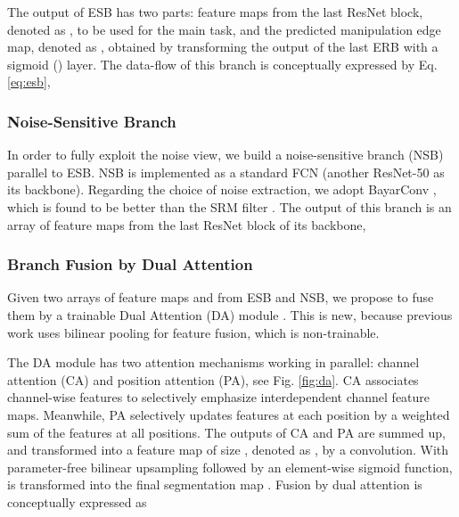 The output of ESB has two parts: feature maps from the last ResNet block, denoted as , to be used for the main task, and the predicted manipulation edge map, denoted as , obtained by transforming the output of the last ERB with a sigmoid () layer. The data-flow of this branch is conceptually expressed by Eq. \ref{eq:esb},






\subsubsection{Noise-Sensitive Branch }\label{sssec:nsb}



In order to fully exploit the noise view, we build a noise-sensitive branch (NSB) parallel to ESB. NSB is implemented as a standard FCN (another ResNet-50 as its backbone). Regarding the choice of noise extraction, we adopt BayarConv \cite{Bayar-journal}, which is found to be better than the SRM filter \cite{2020Constrained}. The output of this branch is an array of  feature maps from the last ResNet block of its backbone, \ie








\subsubsection{Branch Fusion by Dual Attention}\label{sssec:fusion}


Given two arrays of feature maps  and  from ESB and NSB, we propose to fuse them by a trainable Dual Attention (DA) module \cite{danet}. This is new, because previous work \cite{2018rgbn} uses bilinear pooling for feature fusion, which is non-trainable.

The DA module has two attention mechanisms working in parallel: channel attention (CA) and position attention (PA), see Fig. \ref{fig:da}. CA  associates channel-wise  features to selectively emphasize interdependent channel feature maps. Meanwhile, PA selectively updates features at each position by a weighted sum of the features at all positions. The outputs of CA and PA are summed up, and transformed into a feature map of size , denoted as , by a  convolution. With parameter-free bilinear upsampling followed by an element-wise sigmoid function,  is transformed into the final segmentation map . Fusion by dual attention is conceptually expressed as





